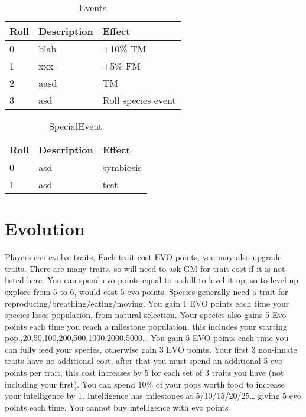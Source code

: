 \begin{table}[hp]
	\centering
		\begin{tabular}{|l|l|l|}
		\hline
		Roll & Description & Effect\\
		\hline
		0 & blah & +10\% \ac{TM}\\
		\hline	
		1 & xxx & +5\% \ac{FM}\\
		\hline
		2 & aasd & \ac{TM}\\
		\hline
		3 & asd & Roll species event\\  
		\hline
		\end{tabular}
	\caption{Events}
	\label{tab:Events}
\end{table}

\begin{table}[h]
	\centering
		\begin{tabular}{|l|l|l|}
		\hline
		Roll & Description & Effect\\
		\hline
		0 & asd & symbiosis\\
		\hline	
		1 & asd & test\\
		\hline
		\end{tabular}
	\caption{SpecialEvent}
	\label{tab:SpecialEvent}
\end{table}

\section{Evolution}
\label{sec:gameplay:Evolution}

Players can evolve traits, Each trait cost EVO points, you may also upgrade traits.
There are many traits, so will need to ask GM for trait cost if it is not listed here.
You can spend evo points equal to a skill to level it up, so to level up explore from 5 to 6, would cost 5 evo points.
Species generally need a trait for reproducing/breathing/eating/moving.
\newline
You gain 1 EVO points each time your species loses population, from natural selection.
Your species also gains 5 Evo points each time you reach a milestone population, this includes your starting pop.,20,50,100,200,500,1000,2000,5000…
You gain 5 EVO points each time you can fully feed your species, otherwise gain 3 EVO points.
\newline
Your first 3 non-innate traits have no additional cost, after that you must spend an additional 5 evo points per trait, this cost increases by 5 for each set of 3 traits you have (not including your first).
\newline
You can spend 10\% of your pops worth food to increase your intelligence by 1. Intelligence has milestones at 5/10/15/20/25… giving 5 evo points each time. You cannot buy intelligence with evo points


